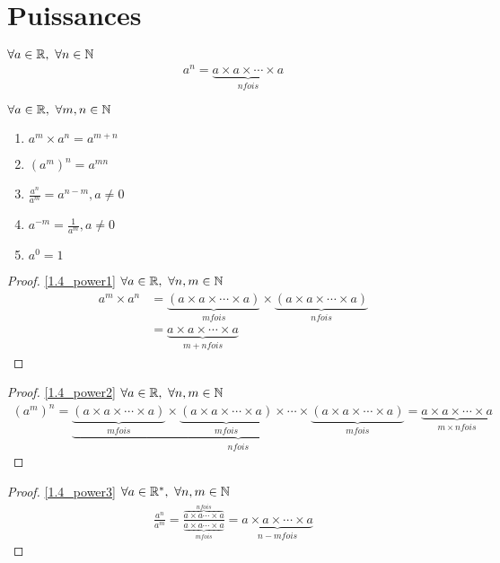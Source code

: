 \section{Puissances}
\begin{definition}
	$\forall a \in \mathbb{R},\ \forall n \in \mathbb{N}$
	\begin{align*}
		a^n = \underbrace{a \times a \times \cdots \times a}_{n fois}
	\end{align*}
\end{definition}
\clearpage
\begin{proposition}
	$\forall a \in \mathbb{R},\ \forall m, n \in \mathbb{N}$
	\begin{enumerate}
		\item \label{1.4_power1} $a^m \times a^n = a^{m + n}$
		\item \label{1.4_power2} $(a^m)^n = a^{mn}$
		\item \label{1.4_power3} $\displaystyle{\frac{a^n}{a^m}} = a^{n - m}, a \neq 0$
		\item \label{1.4_power4} $a^{-m} = \displaystyle{\frac{1}{a^m}}, a \neq 0$
		\item \label{1.4_power5} $a^0 = 1$
	\end{enumerate}
\end{proposition}

\begin{proof}
	\ref{1.4_power1} $\forall a \in \mathbb{R},\ \forall n, m \in \mathbb{N}$
	\begin{align*}
		a^m \times a^n &= \underbrace{(a \times a \times \cdots \times a)}_{m fois} \times \underbrace{(a \times a \times \cdots \times a)}_{n fois} \\
		&= \underbrace{a \times a \times \cdots \times a}_{m + n fois}
	\end{align*}
\end{proof}

\begin{proof}
	\ref{1.4_power2} $\forall a \in \mathbb{R},\ \forall n, m \in \mathbb{N}$
	\begin{align*}
		(a^m)^n = \underbrace{\underbrace{(a \times a \times \cdots \times a)}_{m fois} \times \underbrace{(a \times a \times \cdots \times a)}_{m fois} \times \cdots \times \underbrace{(a \times a \times \cdots \times a)}_{m fois}}_{n fois} = \underbrace{a \times a \times \cdots \times a}_{m \times n fois}
	\end{align*}
\end{proof}

\begin{proof}
	\ref{1.4_power3} $\forall a \in \mathbb{R}^*,\ \forall n, m \in \mathbb{N}$
	\begin{align*}
		\frac{a^n}{a^m} = \frac{\overbrace{a \times a \cdots \times a}^{n fois}}{\underbrace{a \times a \cdots \times a}_{m fois}} = \underbrace{a \times a \times \cdots \times a}_{n - m fois}
	\end{align*}
\end{proof}

